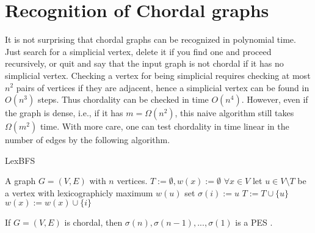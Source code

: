 \chapter{Recognition of Chordal graphs}

It is not surprising that chordal graphs can be recognized in polynomial time. Just search for a simplicial vertex, delete it if you find one and proceed recursively, or quit and say that the input graph
is not chordal if it has no simplicial vertex. Checking a vertex for being simplicial requires checking at most $n^2$ pairs of vertices if they are adjacent, hence a simplicial vertex can be found in $O(n^3)$ steps. Thus chordality can be checked in time $O(n^4)$. However, even if the graph is dense, i.e., if it has $m = \Omega(n^2)$, this naive algorithm still takes $\Omega(m^2)$ time. With more care, one can test chordality in time linear in the number of edges by the following algorithm.

\begin{algorithm}[!ht]
	\caption{LexBFS}
	\begin{algorithmic}[1]
		\Require A graph $G = (V,E)$ with $n$ vertices.
		\State $T := \emptyset, w(x) := \emptyset$ $\forall x \in V$
			\State let $u \in V \setminus T$ be a vertex with lexicographicly maximum $w(u)$
			\State set $\sigma(i) := u$
			\State $T := T \cup \{u\}$
				\State $w(x) := w(x) \cup \{i\}$
			\EndFor
		\EndFor
	\end{algorithmic}
\end{algorithm}

\begin{thm}
	If $G = (V, E)$ is chordal, then $\sigma(n), \sigma(n - 1), . . . , \sigma(1)$ is a PES \PES.
\end{thm}


